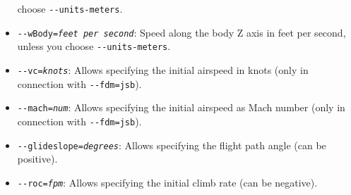 \begin{itemize}
choose \texttt{-$ $-units-meters}.
\item{\texttt{-$ $-wBody={\it feet per second}}}: Speed along the body Z axis in feet per second, unless you
choose \texttt{-$ $-units-meters}.
\item{\texttt{-$ $-vc={\it knots}}}: Allows specifying the initial airspeed in knots
(only in connection with  \texttt{-$ $-fdm=jsb}).
\item{\texttt{-$ $-mach={\it num}}}: Allows specifying the initial airspeed as Mach
number (only in connection with  \texttt{-$ $-fdm=jsb}).
\item{\texttt{-$ $-glideslope={\it degrees}}}: Allows specifying the flight path angle (can be positive).
\item{\texttt{-$ $-roc={\it fpm}}}: Allows specifying the initial climb rate (can be negative).
\end{itemize}
